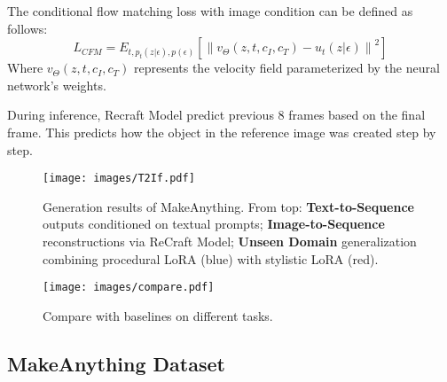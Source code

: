 The conditional flow matching loss with image condition can be defined as follows:
\begin{equation}
L_{CFM} = E_{t, p_t(z|\epsilon), p(\epsilon)} \left[ \left\| v_\Theta(z, t, c_I,c_T) - u_t(z|\epsilon) \right\|^2 \right]
\end{equation}
Where $ v_\Theta(z, t, c_I,c_T)$ represents the velocity field parameterized by the neural network's weights.

During inference, Recraft Model predict previous 8 frames based on the final frame. This predicts how the object in the reference image was created step by step.




\begin{figure*}[htp]
    \centering
    \texttt{[image: images/T2If.pdf]} %
    \vspace{-3mm}
    \caption{Generation results of MakeAnything. From top: \textbf{Text-to-Sequence} outputs conditioned on textual prompts; \textbf{Image-to-Sequence} reconstructions via ReCraft Model; \textbf{Unseen Domain} generalization combining procedural LoRA (blue) with stylistic LoRA (red).  }
    \label{fig4}
\end{figure*}
\vspace{-1mm}

\begin{figure*}[htp]
    \centering
    \texttt{[image: images/compare.pdf]} %
    \vspace{-3mm}
    \caption{Compare with baselines on different tasks.}
    \label{fig5}
\end{figure*}




\subsection{MakeAnything Dataset}
 

